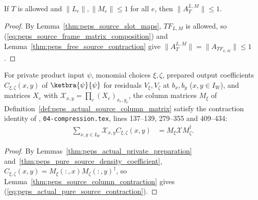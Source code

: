 \begin{lemma}
    \label{thm:peps_source_frame_contraction}
    \leanok
    If $T$ is allowed and $\|L_e\|,\|M_e\|\le 1$ for all $e$, then
    $\|A_T^{L,M}\|\le1$.
\end{lemma}

\begin{proof}\leanok
    By Lemma~\ref{thm:peps_source_slot_maps}, $TF_{L,M}$ is allowed, so
    (\ref{eq:peps_source_frame_matrix_composition}) and
    Lemma~\ref{thm:peps_free_source_contraction} give
    $\|A_T^{L,M}\|=\|A_{TF_{L,M}}\|\le1$.
\end{proof}

\begin{lemma}
    \label{thm:peps_actual_pure_source_contraction}
    \leanok
    For private product input $\psi$, monomial choices $\xi,\zeta$, prepared
    output coefficients $C_{\xi,\zeta}(x,y)$ of $\ketbra{\psi}{\psi}$ for
    residuals $V_\xi,V_\zeta$ at $b_x,b_y$ ($x,y\in I_W$), and matrices $X_e$
    with $\mathcal X_{x,y}=\prod_e(X_e)_{x_e,y_e}$, the column matrices $M_\xi$
    of Definition~\ref{def:peps_actual_source_column_matrix} satisfy the
    contraction identity of \cite[proof of Theorem~5.2]{OpenAI2026PolynomialPEPS},
    \texttt{04-compression.tex}, lines 137--139, 279--355 and 409--434:
    \begin{align}
        \sum_{x,y\in I_W}\mathcal X_{x,y}C_{\xi,\zeta}(x,y)
         & =M_\xi\mathcal X M_\zeta^\dagger.
        \label{eq:peps_actual_pure_source_contraction}
    \end{align}
\end{lemma}

\begin{proof}\leanok
    By Lemmas~\ref{thm:peps_actual_private_preparation}
    and~\ref{thm:peps_pure_source_density_coefficient},
    $C_{\xi,\zeta}(x,y)=M_\xi(:,x)M_\zeta(:,y)^\dagger$, so
    Lemma~\ref{thm:peps_source_column_contraction} gives
    (\ref{eq:peps_actual_pure_source_contraction}).
\end{proof}

